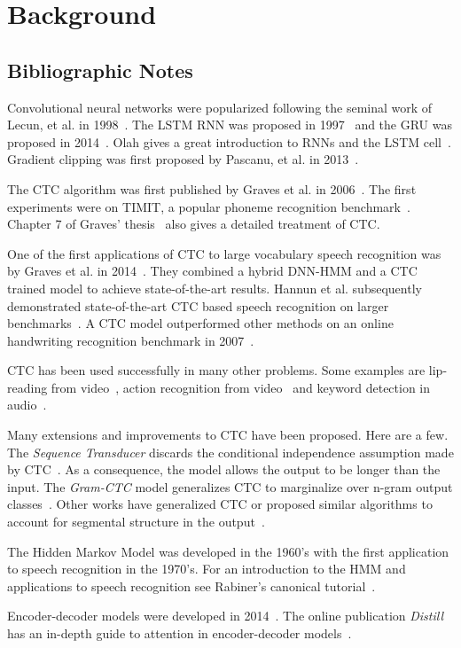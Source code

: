 \chapter{Background}




\section{Bibliographic Notes}

Convolutional neural networks were popularized following the seminal work of
Lecun, et al. in 1998~\cite{lecun1998gradient}. The LSTM RNN was proposed in
1997~\cite{hochreiter1997} and the GRU was proposed in 2014~\cite{cho2014}.
Olah gives a great introduction to RNNs and the LSTM cell~\cite{olah2015}.
Gradient clipping was first proposed by Pascanu, et al. in
2013~\cite{pascanu2013}. 

The CTC algorithm was first published by Graves et al. in
2006~\cite{graves2006}. The first experiments were on TIMIT, a popular phoneme
recognition benchmark~\cite{lopes2011}. Chapter 7 of Graves'
thesis~\cite{graves2012} also gives a detailed treatment of CTC.

One of the first applications of CTC to large vocabulary speech recognition was
by Graves et al. in 2014~\cite{graves2014}. They combined a hybrid DNN-HMM and
a CTC trained model to achieve state-of-the-art results. Hannun et al.
subsequently demonstrated state-of-the-art CTC based speech recognition on
larger benchmarks~\cite{hannun2014deepspeech}. A CTC model outperformed other
methods on an online handwriting recognition benchmark in
2007~\cite{liwicki2007}.

CTC has been used successfully in many other problems. Some examples are
lip-reading from video~\cite{assael2016}, action recognition from
video~\cite{huang2016} and keyword detection in audio~\cite{fernandez2007,
lengerich2016}.

Many extensions and improvements to CTC have been proposed. Here are a few.
The {\it Sequence Transducer} discards the conditional independence assumption
made by CTC~\cite{graves2012transducer}. As a consequence, the model allows the
output to be longer than the input. The {\it Gram-CTC} model generalizes CTC to
marginalize over n-gram output classes~\cite{liu2017}. Other works have
generalized CTC or proposed similar algorithms to account for segmental
structure in the output~\cite{wang2017, kong2016}.

The Hidden Markov Model was developed in the 1960's with the first application
to speech recognition in the 1970's. For an introduction to the HMM and
applications to speech recognition see Rabiner's canonical
tutorial~\cite{rabiner1989}.

Encoder-decoder models were developed in 2014~\cite{cho2014, sutskever2014}.
The online publication {\it Distill} has an in-depth guide to attention in
encoder-decoder models~\cite{olah2016}.
